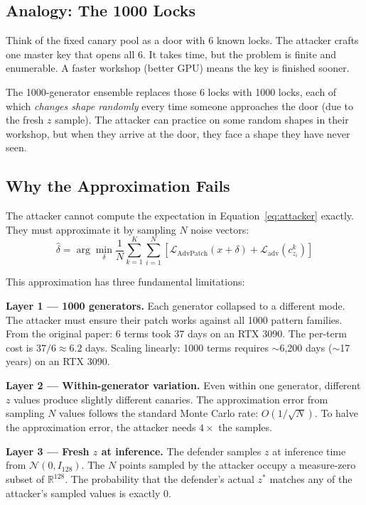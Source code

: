 \documentclass[11pt,a4paper]{article}
\begin{document}
\subsection{Analogy: The 1000 Locks}

Think of the fixed canary pool as a door with 6 known locks. The attacker crafts one master key that opens all 6. It takes time, but the problem is finite and enumerable. A faster workshop (better GPU) means the key is finished sooner.

The 1000-generator ensemble replaces those 6 locks with 1000 locks, each of which \textit{changes shape randomly} every time someone approaches the door (due to the fresh $z$ sample). The attacker can practice on some random shapes in their workshop, but when they arrive at the door, they face a shape they have never seen.

\subsection{Why the Approximation Fails}

The attacker cannot compute the expectation in Equation~\ref{eq:attacker} exactly. They must approximate it by sampling $N$ noise vectors:
\begin{equation}
    \hat{\delta} = \arg\min_\delta \frac{1}{N} \sum_{k=1}^{K} \sum_{i=1}^{N} \left[ \mathcal{L}_{\text{AdvPatch}}(x + \delta) + \mathcal{L}_{\text{adv}}(c^k_{z_i}) \right]
\end{equation}

This approximation has three fundamental limitations:

\textbf{Layer 1 --- 1000 generators.} Each generator collapsed to a different mode. The attacker must ensure their patch works against all 1000 pattern families. From the original paper: 6 terms took 37 days on an RTX 3090. The per-term cost is $37/6 \approx 6.2$ days. Scaling linearly: 1000 terms requires $\sim$6,200 days ($\sim$17 years) on an RTX 3090.

\textbf{Layer 2 --- Within-generator variation.} Even within one generator, different $z$ values produce slightly different canaries. The approximation error from sampling $N$ values follows the standard Monte Carlo rate: $O(1/\sqrt{N})$. To halve the approximation error, the attacker needs $4\times$ the samples.

\textbf{Layer 3 --- Fresh $z$ at inference.} The defender samples $z$ at inference time from $\mathcal{N}(0, I_{128})$. The $N$ points sampled by the attacker occupy a measure-zero subset of $\mathbb{R}^{128}$. The probability that the defender's actual $z^*$ matches any of the attacker's sampled values is exactly 0.
\end{document}
